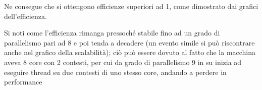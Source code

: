 \documentclass[a4paper,10pt]{article}
\begin{document}
\begin{landscape}
{Ne consegue che si ottengono efficienze superiori ad 1, come dimostrato dai grafici dell'efficienza.

Si noti come l'efficienza rimanga pressoch\'e stabile fino ad un grado di parallelismo pari ad 8 e poi tenda a decadere (un evento simile si pu\`o riscontrare anche nel grafico della scalabilit\`a); ci\`o pu\`o essere dovuto al fatto che la macchina aveva 8 core con 2 contesti, per cui da grado di parallelismo 9 in su inizia ad eseguire thread su due contesti di uno stesso core, andando a perdere in performance}


\end{landscape}
\end{document}
